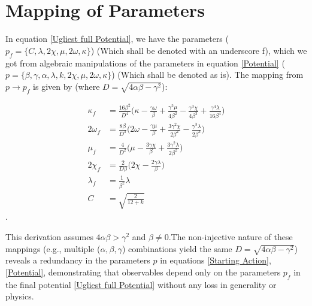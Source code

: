 \documentclass[aps,prd,reprint,preprintnumbers,showpacs,floatfix,nofootinbib,superscript address]{revtex4-2}
\begin{document}
\section{Mapping of Parameters} \label{Mapping of Parameters}
In equation \ref{Ugliest full Potential}, we have the parameters ($p_f = \{C,\lambda, 2\chi, \mu, 2\omega,  \kappa \}$) (Which shall be denoted with an underscore f), which we got from algebraic manipulations of the parameters in equation \ref{Potential} ($p = \{\beta,\gamma,\alpha,\lambda, k, 2\chi, \mu, 2\omega,  \kappa \}$) (Which shall be denoted as is). The mapping from $p \rightarrow p_f$ is given by (where $D = \sqrt{4\alpha \beta- \gamma^2}$):

\begin{align}
    \kappa_f &= \frac{16\beta^2}{D^4}\Big(\kappa - \frac{\gamma\omega}{\beta} + \frac{\gamma^2\mu}{4\beta^2} - \frac{\gamma^3\chi}{4\beta^3} +\frac{\gamma^4\lambda}{16\beta^4} \Big)   \nonumber \\
    2\omega_f &= \frac{8\beta}{D^3} \Big(2\omega - \frac{\gamma\mu}{\beta} + \frac{3\gamma^2\chi}{2\beta^2} - \frac{\gamma^3\lambda}{2\beta^3}\Big)   \nonumber \\
    \mu_f &= \frac{4}{D^2} \Big(\mu - \frac{3\gamma\chi}{\beta} + \frac{3\gamma^2\lambda}{2\beta^2} \Big) \nonumber \\
    2\chi_f &= \frac{2}{D\beta} \Big(2\chi - \frac{2\gamma\lambda}{\beta}\Big) \nonumber \\
    \lambda_f &= \frac{1}{\beta^2}\lambda \nonumber \\
    C &= \sqrt{\frac{2}{12+k}}
\end{align}.

This derivation assumes $4\alpha\beta > \gamma^2$ and $\beta \neq 0. $The non-injective nature of these mappings (e.g., multiple ($\alpha,\beta,\gamma$) combinations yield the same $D = \sqrt{4\alpha\beta - \gamma^2}$) reveals a redundancy in the parameters $p$ in equations \ref{Starting Action}, \ref{Potential}, demonstrating that observables depend only on the parameters $p_f$ in the final potential \ref{Ugliest full Potential} without any loss in generality or physics. 

\newpage
\,
\newpage
\printbibliography
\end{document}
